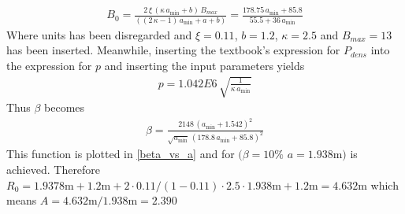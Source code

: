 \begin{align}
	B_{0}=\frac{2\,\xi\,(\kappa\, a_{\min}+b)\, B_{max}}{((2\,\kappa-1)\, a_{\min}+a+b)}=\frac{178.75\, a_{\min}+85.8}{55.5+36\, a_{\min}}
\end{align}
Where units has been disregarded and $\xi=0.11$, $b=1.2$, $\kappa=2.5$ and $B_{\si{max}}=13$ has been inserted. Meanwhile, inserting the textbook's expression for $P_{\si{dens}}$ into the expression for $p$ and inserting the input parameters yields
\begin{align}
	p=1.042\si{E}6\,\sqrt{\frac{1}{\kappa\, a_{\min}}}
\end{align}
Thus \(\beta\) becomes
\begin{align}
	\beta=\frac{2148\,(a_{\min}+1.542)^{2}}{\sqrt{a_{\min}}\,(178.8\, a_{\min}+85.8)^{2}}
\end{align}
This function is plotted in \cref{beta_vs_a} and for $(\beta=10\%$ $a=1.938\si{\metre})$ is achieved. Therefore \(R_{0}=1.9378\si{\metre}+1.2\si{\metre}+2\cdot 0.11/(1-0.11)\cdot 2.5\cdot 1.938\si{\metre}+1.2\si{\metre}=4.632\si{\metre}\) which means \(A=4.632\si{\metre}/1.938\si{\metre}=2.390\)
